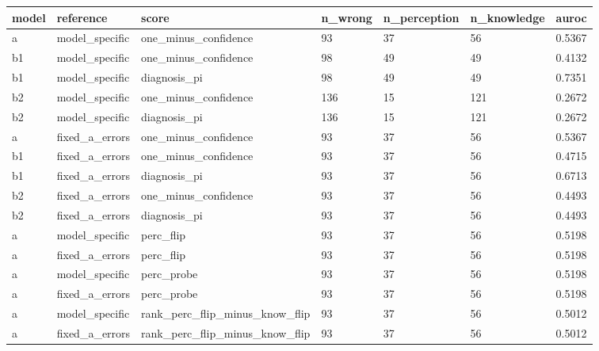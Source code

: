\begin{tabular}{lllllll}
\hline
model & reference & score & n\_wrong & n\_perception & n\_knowledge & auroc \\
\hline
a & model\_specific & one\_minus\_confidence & 93 & 37 & 56 & 0.5367 \\
b1 & model\_specific & one\_minus\_confidence & 98 & 49 & 49 & 0.4132 \\
b1 & model\_specific & diagnosis\_pi & 98 & 49 & 49 & 0.7351 \\
b2 & model\_specific & one\_minus\_confidence & 136 & 15 & 121 & 0.2672 \\
b2 & model\_specific & diagnosis\_pi & 136 & 15 & 121 & 0.2672 \\
a & fixed\_a\_errors & one\_minus\_confidence & 93 & 37 & 56 & 0.5367 \\
b1 & fixed\_a\_errors & one\_minus\_confidence & 93 & 37 & 56 & 0.4715 \\
b1 & fixed\_a\_errors & diagnosis\_pi & 93 & 37 & 56 & 0.6713 \\
b2 & fixed\_a\_errors & one\_minus\_confidence & 93 & 37 & 56 & 0.4493 \\
b2 & fixed\_a\_errors & diagnosis\_pi & 93 & 37 & 56 & 0.4493 \\
a & model\_specific & perc\_flip & 93 & 37 & 56 & 0.5198 \\
a & fixed\_a\_errors & perc\_flip & 93 & 37 & 56 & 0.5198 \\
a & model\_specific & perc\_probe & 93 & 37 & 56 & 0.5198 \\
a & fixed\_a\_errors & perc\_probe & 93 & 37 & 56 & 0.5198 \\
a & model\_specific & rank\_perc\_flip\_minus\_know\_flip & 93 & 37 & 56 & 0.5012 \\
a & fixed\_a\_errors & rank\_perc\_flip\_minus\_know\_flip & 93 & 37 & 56 & 0.5012 \\
\hline
\end{tabular}
